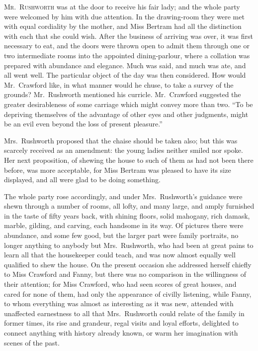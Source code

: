 \documentclass{article}
\newcommand{\gintro}[1]{\textcolor{gcolor}{\textsc{#1}}}
\begin{document}
\gintro{Mr.\ Rushworth} was at the door to receive his fair lady;
and the whole party were welcomed by him with due attention.
In the drawing-room they were met with equal cordiality
by the mother, and Miss Bertram had all the distinction
with each that she could wish.  After the business
of arriving was over, it was first necessary to eat,
and the doors were thrown open to admit them through one
or two intermediate rooms into the appointed dining-parlour,
where a collation was prepared with abundance and elegance.
Much was said, and much was ate, and all went well.
The particular object of the day was then considered.
How would Mr.\ Crawford like, in what manner would he chuse,
to take a survey of the grounds?  Mr.\ Rushworth mentioned
his curricle.  Mr.\ Crawford suggested the greater desirableness
of some carriage which might convey more than two.
``To be depriving themselves of the advantage of other eyes
and other judgments, might be an evil even beyond the loss
of present pleasure.''

Mrs.\ Rushworth proposed that the chaise should be taken also;
but this was scarcely received as an amendment:  the young
ladies neither smiled nor spoke.  Her next proposition,
of shewing the house to such of them as had not been
there before, was more acceptable, for Miss Bertram was
pleased to have its size displayed, and all were glad
to be doing something.

The whole party rose accordingly, and under Mrs.\ Rushworth's
guidance were shewn through a number of rooms, all lofty,
and many large, and amply furnished in the taste of fifty
years back, with shining floors, solid mahogany, rich damask,
marble, gilding, and carving, each handsome in its way.
Of pictures there were abundance, and some few good,
but the larger part were family portraits, no longer
anything to anybody but Mrs.\ Rushworth, who had been at
great pains to learn all that the housekeeper could teach,
and was now almost equally well qualified to shew the house.
On the present occasion she addressed herself chiefly
to Miss Crawford and Fanny, but there was no comparison
in the willingness of their attention; for Miss Crawford,
who had seen scores of great houses, and cared for none
of them, had only the appearance of civilly listening,
while Fanny, to whom everything was almost as interesting
as it was new, attended with unaffected earnestness to all
that Mrs.\ Rushworth could relate of the family in former times,
its rise and grandeur, regal visits and loyal efforts,
delighted to connect anything with history already known,
or warm her imagination with scenes of the past.
\end{document}
